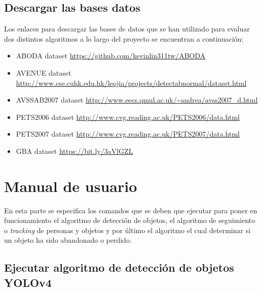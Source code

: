\subsection{Descargar las bases datos}
\label{subsec:descarga-datasets}

Los enlaces para descargar las bases de datos que se han utilizado para evaluar dos distintos algoritmos a lo largo del proyecto se encuentran a continuación:

\begin{itemize}
    \item ABODA dataset \url{https://github.com/kevinlin311tw/ABODA} \cite{aboda-dataset}
    \item AVENUE dataset \url{http://www.cse.cuhk.edu.hk/leojia/projects/detectabnormal/dataset.html} \cite{avenue-dataset}
    \item AVSSAB2007 dataset \url{http://www.eecs.qmul.ac.uk/~andrea/avss2007_d.html} \cite{AVSSAB2007-dataset}
    \item PETS2006 dataset \url{http://www.cvg.reading.ac.uk/PETS2006/data.html} \cite{pets2006-dataset}
    \item PETS2007 dataset \url{http://www.cvg.reading.ac.uk/PETS2007/data.html} \cite{pets2007-dataset}
    \item GBA dataset \url{https://bit.ly/3aVlGZL} \cite{gba-dataset}
\end{itemize}

\section{Manual de usuario}
\label{sec:manual-usuario}

En esta parte se especifica los comandos que se deben que ejecutar para poner en funcionamiento el algoritmo de detección de objetos, el algoritmo de seguimiento o \textit{tracking} de personas y objetos y por último el algoritmo el cual determinar si un objeto ha sido abandonado o perdido.

\subsection{Ejecutar algoritmo de detección de objetos YOLOv4}

